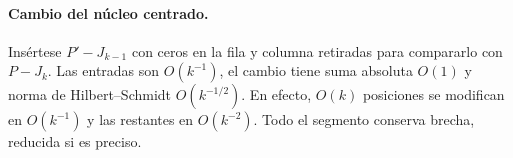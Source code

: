 \paragraph{Cambio del núcleo centrado.}
Insértese $P'-J_{k-1}$ con ceros en la fila y columna retiradas para compararlo con $P-J_k$.
Las entradas son $O(k^{-1})$, el cambio tiene suma absoluta $O(1)$ y norma de
Hilbert--Schmidt $O(k^{-1/2})$. En efecto, $O(k)$ posiciones se modifican en $O(k^{-1})$
y las restantes en $O(k^{-2})$. Todo el segmento conserva brecha, reducida si es preciso.
